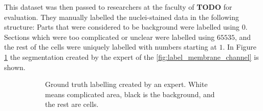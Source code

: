 \documentclass[
  digital,     %
  oneside,     %
  nosansbold,  %
  nocolorbold, %
  lof,         %
  lot,         %
]{fithesis4}
\begin{document}
This dataset was then passed to researchers at the faculty of \textbf{TODO} for
evaluation. They manually labelled the nuclei-stained data in the following
structure: Parts that were considered to be background were labelled using $0$.
Sections which were too complicated or unclear were labelled using $65535$, and
the rest of the cells were uniquely labelled with numbers starting at $1$. In
Figure \ref{fig:label_ground_truth} the segmentation created by the expert of
the \ref{fig:label_membrane_channel} is shown.

\begin{figure}
    \centering
    \begin{subfigure}[t]{0.4\textwidth}
        \centering
        \caption{Ground truth labelling created by an expert. White means
        complicated area, black is the background, and the rest are cells.}
        \label{fig:label_ground_truth}
    \end{subfigure}
    \hfill
    \begin{subfigure}[t]{0.4\textwidth}
        \centering

\end{subfigure}
\end{figure}
\end{document}
